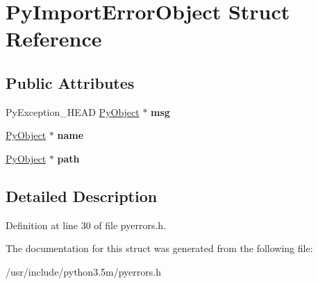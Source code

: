 \hypertarget{structPyImportErrorObject}{}\section{Py\+Import\+Error\+Object Struct Reference}
\label{structPyImportErrorObject}
\subsection*{Public Attributes}
\begin{DoxyCompactItemize}
\item 
Py\+Exception\+\_\+\+H\+E\+AD \hyperlink{struct__object}{Py\+Object} $\ast$ {\bfseries msg}\hypertarget{structPyImportErrorObject_a97da1dae8ab1ea8adc9808e66ed67152}{}\label{structPyImportErrorObject_a97da1dae8ab1ea8adc9808e66ed67152}

\item 
\hyperlink{struct__object}{Py\+Object} $\ast$ {\bfseries name}\hypertarget{structPyImportErrorObject_a247abd6db0e1262db66ef83375afa95d}{}\label{structPyImportErrorObject_a247abd6db0e1262db66ef83375afa95d}

\item 
\hyperlink{struct__object}{Py\+Object} $\ast$ {\bfseries path}\hypertarget{structPyImportErrorObject_a0ef77bd6a01c2698e17de6a726e33cdc}{}\label{structPyImportErrorObject_a0ef77bd6a01c2698e17de6a726e33cdc}

\end{DoxyCompactItemize}


\subsection{Detailed Description}


Definition at line 30 of file pyerrors.\+h.



The documentation for this struct was generated from the following file\+:\begin{DoxyCompactItemize}
\item 
/usr/include/python3.\+5m/pyerrors.\+h\end{DoxyCompactItemize}
